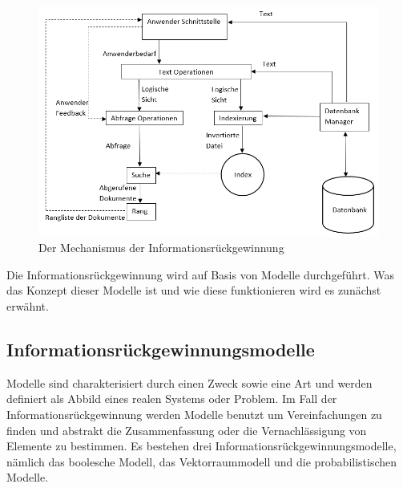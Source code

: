 \begin{figure}[htb]
	\centering
	\includegraphics[clip, scale=0.8]{./gfx/Abbildung1_Information_retrievial_Mechanismus.png}
	\caption[Information retrieval Mechanismus]{Der Mechanismus der Informationsrückgewinnung \cite{BRI99}}
	\label{fig:IRMechanismus}
\end{figure}


Die Informationsrückgewinnung wird auf Basis von Modelle durchgeführt. Was das Konzept dieser Modelle ist und wie diese funktionieren wird es zunächst erwähnt.

\subsection{Informationsrückgewinnungsmodelle}
\label{subsec:IRModelle}

Modelle sind charakterisiert durch einen Zweck sowie eine Art und werden definiert als Abbild eines realen Systems oder Problem. Im Fall der Informationsrückgewinnung werden Modelle benutzt um Vereinfachungen zu finden und abstrakt die Zusammenfassung oder die Vernachlässigung von Elemente zu bestimmen. Es bestehen drei Informationsrückgewinnungsmodelle, nämlich das boolesche Modell, das Vektorraummodell und die probabilistischen Modelle.


